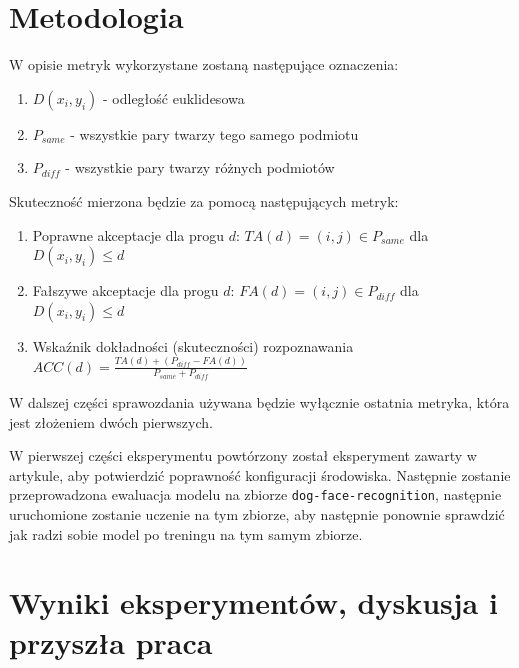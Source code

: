 \documentclass[11pt]{article}
\begin{document}
    \section{Metodologia}
    W opisie metryk wykorzystane zostaną następujące oznaczenia:
    \begin{enumerate}
        \item $D(x_i, y_i)$ - odległość euklidesowa
        \item $P_{same}$ - wszystkie pary twarzy tego samego podmiotu
        \item $P_{diff}$ - wszystkie pary twarzy różnych podmiotów
    \end{enumerate}

    Skuteczność mierzona będzie za pomocą następujących metryk:
    \begin{enumerate}
        \item Poprawne akceptacje dla progu $d$: $TA(d) = {(i, j) \in P_{same}}$ dla $D(x_i, y_i) \leq d $
        \item Fałszywe akceptacje dla progu $d$: $FA(d) = {(i, j) \in P_{diff}}$ dla $D(x_i, y_i) \leq d $
        \item Wskaźnik dokładności (skuteczności) rozpoznawania $ACC(d) = \frac{TA(d) + (P_{diff} - FA(d))}{P_{same} + P_{diff}}$
    \end{enumerate}

    W dalszej części sprawozdania używana będzie wyłącznie ostatnia metryka, która jest złożeniem dwóch pierwszych.

    W pierwszej części eksperymentu powtórzony został eksperyment zawarty w artykule, aby potwierdzić poprawność konfiguracji środowiska.
    Następnie zostanie przeprowadzona ewaluacja modelu na zbiorze \texttt{dog-face-recognition}, następnie uruchomione zostanie uczenie na tym zbiorze,
    aby następnie ponownie sprawdzić jak radzi sobie model po treningu na tym samym zbiorze.

    \section{Wyniki eksperymentów, dyskusja i przyszła praca}
\end{document}
